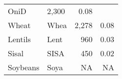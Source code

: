 \documentclass[]{article}
\begin{document}
\begin{longtable}[]{@{}llrr@{}}
\begin{minipage}[t]{0.16\columnwidth}
OniD\strut
\end{minipage} & \begin{minipage}[t]{0.12\columnwidth}\raggedleft\strut
2,300\strut
\end{minipage} & \begin{minipage}[t]{0.09\columnwidth}\raggedleft\strut
0.08\strut
\end{minipage}\tabularnewline
\begin{minipage}[t]{0.36\columnwidth}\raggedright\strut
Wheat\strut
\end{minipage} & \begin{minipage}[t]{0.16\columnwidth}\raggedright\strut
Whea\strut
\end{minipage} & \begin{minipage}[t]{0.12\columnwidth}\raggedleft\strut
2,278\strut
\end{minipage} & \begin{minipage}[t]{0.09\columnwidth}\raggedleft\strut
0.08\strut
\end{minipage}\tabularnewline
\begin{minipage}[t]{0.36\columnwidth}\raggedright\strut
Lentils\strut
\end{minipage} & \begin{minipage}[t]{0.16\columnwidth}\raggedright\strut
Lent\strut
\end{minipage} & \begin{minipage}[t]{0.12\columnwidth}\raggedleft\strut
960\strut
\end{minipage} & \begin{minipage}[t]{0.09\columnwidth}\raggedleft\strut
0.03\strut
\end{minipage}\tabularnewline
\begin{minipage}[t]{0.36\columnwidth}\raggedright\strut
Sisal\strut
\end{minipage} & \begin{minipage}[t]{0.16\columnwidth}\raggedright\strut
SISA\strut
\end{minipage} & \begin{minipage}[t]{0.12\columnwidth}\raggedleft\strut
450\strut
\end{minipage} & \begin{minipage}[t]{0.09\columnwidth}\raggedleft\strut
0.02\strut
\end{minipage}\tabularnewline
\begin{minipage}[t]{0.36\columnwidth}\raggedright\strut
Soybeans\strut
\end{minipage} & \begin{minipage}[t]{0.16\columnwidth}\raggedright\strut
Soya\strut
\end{minipage} & \begin{minipage}[t]{0.12\columnwidth}\raggedleft\strut
NA\strut
\end{minipage} & \begin{minipage}[t]{0.09\columnwidth}\raggedleft\strut
NA\strut
\end{minipage}\tabularnewline
\bottomrule
\end{longtable}
\end{document}

